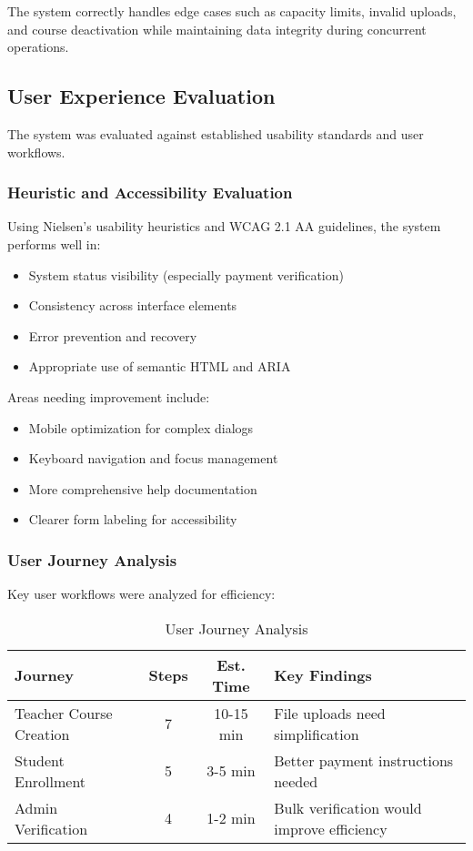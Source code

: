The system correctly handles edge cases such as capacity limits, invalid uploads, and course deactivation while maintaining data integrity during concurrent operations.

\subsection{User Experience Evaluation}

The system was evaluated against established usability standards and user workflows.

\subsubsection{Heuristic and Accessibility Evaluation}

Using Nielsen's usability heuristics and WCAG 2.1 AA guidelines, the system performs well in:
\begin{itemize}
    \item System status visibility (especially payment verification)
    \item Consistency across interface elements
    \item Error prevention and recovery
    \item Appropriate use of semantic HTML and ARIA
\end{itemize}

Areas needing improvement include:
\begin{itemize}
    \item Mobile optimization for complex dialogs
    \item Keyboard navigation and focus management
    \item More comprehensive help documentation
    \item Clearer form labeling for accessibility
\end{itemize}

\subsubsection{User Journey Analysis}

Key user workflows were analyzed for efficiency:

\begin{table}[h]
\centering
\begin{tabular}{|l|c|c|l|}
\hline
\textbf{Journey} & \textbf{Steps} & \textbf{Est. Time} & \textbf{Key Findings} \\
\hline
Teacher Course Creation & 7 & 10-15 min & File uploads need simplification \\
Student Enrollment & 5 & 3-5 min & Better payment instructions needed \\
Admin Verification & 4 & 1-2 min & Bulk verification would improve efficiency \\
\hline
\end{tabular}
\caption{User Journey Analysis}
\label{tab:journeys}
\end{table}

